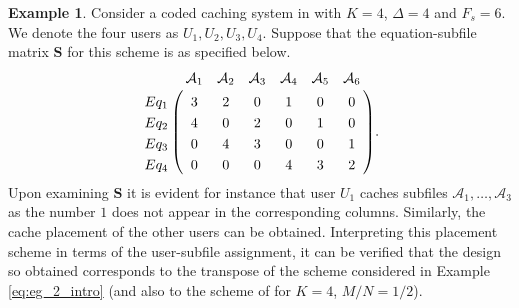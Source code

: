\documentclass[journal,twocolumn]{IEEEtran}
\theoremstyle{definition}
\newtheorem{example}{Example}
\newcommand{\calA}{\mathcal{A}}
\newcommand{\bfS}{\mathbf{S}}
\begin{document}
\begin{example}
	\label{ex:lemmablock}
	Consider a coded caching system in \cite{maddahN14} with $K=4$, $\Delta=4$ and $F_s=6$. We denote the four users as $U_1, U_2, U_3, U_4$.
 Suppose that the equation-subfile matrix $\bfS$ for this scheme is as specified below.
	\begin{align*}
	\bordermatrix{~ & \calA_1 & \calA_2 & \calA_3 & \calA_4 & \calA_5 & \calA_6 \cr
		Eq_1 & 3 & 2 & 0 & 1 & 0 & 0\cr
		Eq_2 & 4 & 0 & 2 & 0 & 1 & 0\cr
		Eq_3 & 0 & 4 & 3 & 0 & 0 & 1\cr
		Eq_4 & 0 & 0 & 0 & 4 & 3 & 2\cr}.
	\end{align*}
Upon examining $\bfS$ it is evident for instance that user $U_1$ caches subfiles $\calA_1, \dots, \calA_3$ as the number $1$ does not appear in the corresponding columns. Similarly, the cache placement of the other users can be obtained. Interpreting this placement scheme in terms of the user-subfile assignment, it can be verified that the design so obtained corresponds to the transpose of the scheme considered in Example \ref{eq:eg_2_intro} (and also to the scheme of \cite{maddahN14} for $K=4$, $M/N = 1/2$).
\end{example}
\end{document}
